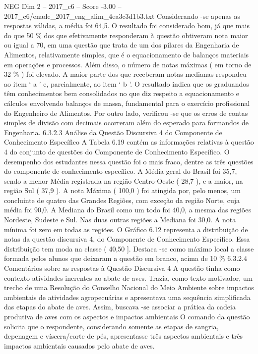 \begin{textsample}{NEG Dim 2 – 2017\_c6 – Score -3.00 – 2017\_c6/enade\_2017\_eng\_alim\_4ea3c3d1b3.txt}
Considerando -se apenas as respostas válidas, a média foi 64,5.
O resultado foi considerado bom, já que mais do que 50 \% dos que efetivamente responderam à questão obtiveram nota maior ou igual a 70, em uma questão que trata de um dos pilares da Engenharia de Alimentos, relativamente simples, que é o equacionamento de balanços materiais em operações e processos.
Além disso, o número de notas máximas ( em torno de 32 \% ) foi elevado.
A maior parte dos que receberam notas medianas respondeu ao item ‘ a ’ e, parcialmente, ao item ‘ b ’.
O resultado indica que os graduandos têm conhecimentos bem consolidados no que diz respeito a equacionamento e cálculos envolvendo balanços de massa, fundamental para o exercício profissional do Engenheiro de Alimentos.
Por outro lado, verificou -se que os erros de contas simples de divisão com decimais ocorreram além do esperado para formandos de Engenharia. 6.3.2.3 Análise da Questão Discursiva 4 do Componente de Conhecimento Específico A Tabela 6.19 contém as informações relativas à questão 4 do conjunto de questões do Componente de Conhecimento Específico.
O desempenho dos estudantes nessa questão foi o mais fraco, dentre as três questões do componente de conhecimento específico.
A Média geral do Brasil foi 35,7, sendo a menor Média registrada na região Centro-Oeste ( 28,7 ), e a maior, na região Sul ( 37,9 ).
A nota Máxima ( 100,0 ) foi atingida por, pelo menos, um concluinte de quatro das Grandes Regiões, com exceção da região Norte, cuja média foi 90,0.
A Mediana do Brasil como um todo foi 40,0, a mesma das regiões Nordeste, Sudeste e Sul.
Nas duas outras regiões a Mediana foi 30,0.
A nota mínima foi zero em todas as regiões.
O Gráfico 6.12 representa a distribuição de notas da questão discursiva 4, do Componente de Conhecimento Específico.
Essa distribuição tem moda na classe ( 40,50 ].
Destaca -se como máximo local a classe formada pelos alunos que deixaram a questão em branco, acima de 10 \% 6.3.2.4 Comentários sobre as respostas à Questão Discursiva 4 A questão tinha como contexto atividades inerentes ao abate de aves.
Trazia, como texto motivador, um trecho de uma Resolução do Conselho Nacional do Meio Ambiente sobre impactos ambientais de atividades agropecuárias e apresentava uma sequência simplificada das etapas do abate de aves.
Assim, buscava -se associar a prática da cadeia produtiva de aves com os aspectos e impactos ambientais O comando da questão solicita que o respondente, considerando somente as etapas de sangria, depenagem e víscera/corte de pés, apresentasse três aspectos ambientais e três impactos ambientais causados pelo abate de aves.

\end{textsample}
